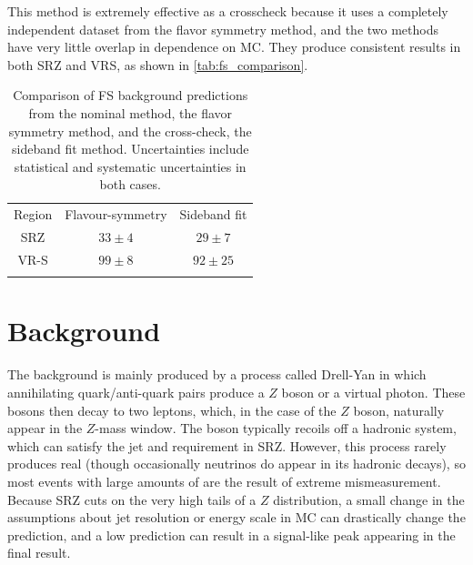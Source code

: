 This method is extremely effective as a crosscheck because it uses a completely independent dataset from the flavor symmetry method, and the two methods have very little overlap in dependence on \ac{MC}. They produce consistent results in both SRZ and VRS, as shown in \autoref{tab:fs_comparison}.


\begin{table}[h]
\centering

\begin{tabular}{ccc}
\noalign{\smallskip}\hline\noalign{\smallskip}
Region  & Flavour-symmetry  & Sideband fit  \\
\noalign{\smallskip}\hline\hline\noalign{\smallskip}
SRZ & $33 \pm 4$   &  $29 \pm 7$  \\ [+0.05cm]
VR-S & $99\pm8$        &  $92 \pm 25$  \\ [+0.05cm]
\noalign{\smallskip}\hline\hline
\end{tabular}
\caption{ Comparison of \ac{FS} background predictions from the nominal method, the flavor symmetry method, and the cross-check, the sideband fit method. Uncertainties include statistical and systematic uncertainties in both cases. }
\label{tab:fs_comparison}
\end{table}


\section{\dyjets Background}
\label{sec:bg-z}

The \dyjets background is mainly produced by a process called Drell-Yan in which annihilating quark/anti-quark pairs produce a $Z$ boson or a virtual photon. These bosons then decay to two leptons, which, in the case of the $Z$ boson, naturally appear in the $Z$-mass window. The boson typically recoils off a hadronic system, which can satisfy the jet and \HT requirement in SRZ. However, this process rarely produces real \met (though occasionally neutrinos do appear in its hadronic decays), so most events with large amounts of \met are the result of extreme mismeasurement. Because SRZ cuts on the very high \met tails of a $Z$ distribution, a small change in the assumptions about jet resolution or energy scale in \ac{MC} can drastically change the prediction, and a low \dyjets prediction can result in a signal-like peak appearing in the final result. 

